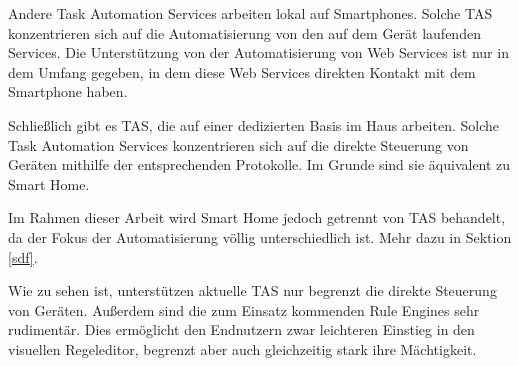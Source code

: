 \documentclass[12pt]{article}
\begin{document}
Andere Task Automation Services arbeiten lokal auf Smartphones. Solche TAS konzentrieren sich auf die Automatisierung von den auf dem Gerät laufenden Services. Die Unterstützung von der Automatisierung von Web Services ist nur in dem Umfang gegeben, in dem diese Web Services direkten Kontakt mit dem Smartphone haben.  

Schließlich gibt es TAS, die auf einer dedizierten Basis im Haus arbeiten. Solche Task Automation Services konzentrieren sich auf die direkte Steuerung von Geräten mithilfe der entsprechenden Protokolle. Im Grunde sind sie äquivalent zu Smart Home. 

Im Rahmen dieser Arbeit wird Smart Home jedoch getrennt von TAS behandelt, da der Fokus der Automatisierung völlig unterschiedlich ist. Mehr dazu in Sektion \ref{sdf}.

Wie zu sehen ist, unterstützen aktuelle TAS nur begrenzt die direkte Steuerung von Geräten. Außerdem sind die zum Einsatz kommenden Rule Engines sehr rudimentär. Dies ermöglicht den Endnutzern zwar leichteren Einstieg in den visuellen Regeleditor, begrenzt aber auch gleichzeitig stark ihre Mächtigkeit. 





\end{document}
